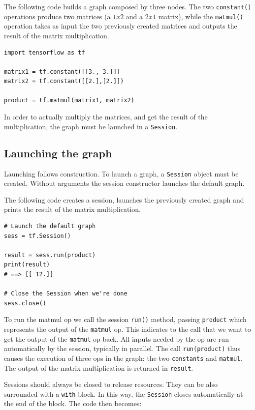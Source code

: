 The following code builds a graph composed by three nodes. The two \lstinline|constant()| operations produce two matrices (a $1x2$ and a $2x1$ matrix), while the \lstinline|matmul()| operation takes as input the two previously created matrices and outputs the result of the matrix multiplication.

\begin{lstlisting}
import tensorflow as tf

matrix1 = tf.constant([[3., 3.]])
matrix2 = tf.constant([[2.],[2.]])

product = tf.matmul(matrix1, matrix2)
\end{lstlisting}

In order to actually multiply the matrices, and get the result of the multiplication, the graph must be launched in a \lstinline|Session|.

\subsection{Launching the graph}

Launching follows construction. To launch a graph, a \lstinline|Session| object must be created. Without arguments the session constructor launches the default graph.

The following code creates a session, launches the previously created graph and prints the result of the matrix multiplication.

\begin{lstlisting}
# Launch the default graph
sess = tf.Session()

result = sess.run(product)
print(result)
# ==> [[ 12.]]

# Close the Session when we're done
sess.close()
\end{lstlisting}

To run the matmul op we call the session \lstinline|run()| method, passing \lstinline|product| which represents the output of the \lstinline|matmul| op. This indicates to the call that we want to get the output of the \lstinline|matmul| op back. All inputs needed by the op are run automatically by the session, typically in parallel. The call \lstinline|run(product)| thus causes the execution of three ops in the graph: the two \lstinline|constants| and \lstinline|matmul|. The output of the matrix multiplication is returned in \lstinline|result|.

Sessions should always be closed to release resources.  They can be also surrounded with a \lstinline|with| block. In this way, the \lstinline|Session| closes automatically at the end of the block. The code then becomes:

